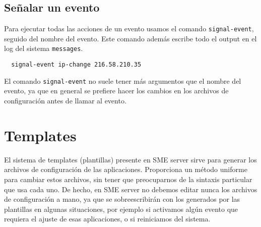 \subsection{Señalar un evento}
Para ejecutar todas las acciones de un evento usamos el comando \lstinline!signal-event!, seguido del nombre del evento. Este comando además escribe todo el output en el log del sistema \lstinline!messages!.

\begin{lstlisting}
  signal-event ip-change 216.58.210.35
\end{lstlisting}

El comando \lstinline!signal-event! no suele tener más argumentos que el nombre del evento, ya que en general se prefiere hacer los cambios en los archivos de configuración antes de llamar al evento.

\begin{comment}
\subsection{Eventos importantes}

\begin{longtable}{p{0.15\textwidth} |p{0.15\textwidth} | p{0.61\textwidth} }
  \textbf{Evento} & \textbf{Argumento} & \textbf{Descripción}\\\hline
  \lstinline!aaa! & - & bbb\\
\end{longtable}
\end{comment}

%
%

\section{Templates}

El sistema de templates (plantillas) presente en SME server sirve para generar los archivos de configuración de las aplicaciones. Proporciona un método uniforme para cambiar estos archivos, sin tener que preocuparnos de la sintaxis particular que usa cada uno. De hecho, en SME server no debemos editar nunca los archivos de configuración a mano, ya que se sobreescribirán con los generados por las plantillas en algunas situaciones, por ejemplo si activamos algún evento que requiera el ajuste de esas aplicaciones, o si reiniciamos del sistema.\\

